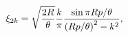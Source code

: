 \begin{equation}
\label{ourxis}
\xi_{2k}=\sqrt{2R\over\theta}\frac{k}{\pi}\frac{\sin\pi {Rp}/{\theta}}
{\left({Rp}/{\theta}\right)^2-k^2},
\end{equation}

